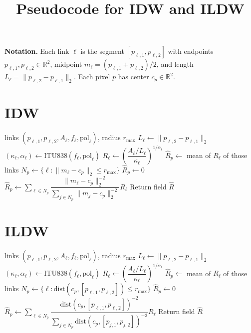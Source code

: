 \documentclass[11pt]{article}
\title{Pseudocode for IDW and ILDW}
\date{}
\newcommand{\RR}{\mathbb{R}}
\begin{document}
\maketitle

\noindent\textbf{Notation.}
Each link $\ell$ is the segment $[p_{\ell,1},p_{\ell,2}]$ with endpoints
$p_{\ell,1},p_{\ell,2}\in\RR^2$, midpoint
$m_\ell = (p_{\ell,1}+p_{\ell,2})/2$, and length
$L_\ell = \|p_{\ell,2}-p_{\ell,1}\|_2$.
Each pixel $p$ has center $c_p\in\RR^2$.

\section*{IDW}
\begin{algorithm}[h]
\caption{Discretized Midpoint IDW}
\begin{algorithmic}[1]
\Require links $(p_{\ell,1},p_{\ell,2},A_\ell,f_\ell,\mathrm{pol}_\ell)$, radius $r_{\max}$
\State $L_\ell \gets \|p_{\ell,2}-p_{\ell,1}\|_2$
\State $(\kappa_\ell,\alpha_\ell) \gets \mathrm{ITU838}(f_\ell,\mathrm{pol}_\ell)$
\State $R_\ell \gets \left(\dfrac{A_\ell/L_\ell}{\kappa_\ell}\right)^{1/\alpha_\ell}$
\EndFor
{}
\State $\hat R_p \gets$ mean of $R_\ell$ of those links
\Else
\State $N_p \gets \{\ell:\|m_\ell-c_p\|_2\le r_{\max}\}$
\State $\hat R_p \gets 0$
\Else
\State $\hat R_p \gets \sum_{\ell\in N_p}\dfrac{\|m_\ell-c_p\|_2^{-2}}{\sum_{j\in N_p}\|m_j-c_p\|_2^{-2}} R_\ell$
\EndIf
\EndIf
\EndFor
\State Return field $\hat R$
\end{algorithmic}
\end{algorithm}

\clearpage
\section*{ILDW}
\begin{algorithm}[h]
\caption{Segment-Distance ILDW}
\begin{algorithmic}[1]
\Require links $(p_{\ell,1},p_{\ell,2},A_\ell,f_\ell,\mathrm{pol}_\ell)$, radius $r_{\max}$
\State $L_\ell \gets \|p_{\ell,2}-p_{\ell,1}\|_2$
\State $(\kappa_\ell,\alpha_\ell) \gets \mathrm{ITU838}(f_\ell,\mathrm{pol}_\ell)$
\State $R_\ell \gets \left(\dfrac{A_\ell/L_\ell}{\kappa_\ell}\right)^{1/\alpha_\ell}$
\EndFor
{}
\State $\hat R_p \gets$ mean of $R_\ell$ of those links
\Else
\State $N_p \gets \{\ell : \mathrm{dist}(c_p,[p_{\ell,1},p_{\ell,2}]) \le r_{\max}\}$
\State $\hat R_p \gets 0$
\Else
\State $\hat R_p \gets \sum_{\ell\in N_p}\dfrac{\mathrm{dist}(c_p,[p_{\ell,1},p_{\ell,2}])^{-2}}{\sum_{j\in N_p}\mathrm{dist}(c_p,[p_{j,1},p_{j,2}])^{-2}} R_\ell$
\EndIf
\EndIf
\EndFor
\State Return field $\hat R$
\end{algorithmic}
\end{algorithm}
\end{document}
